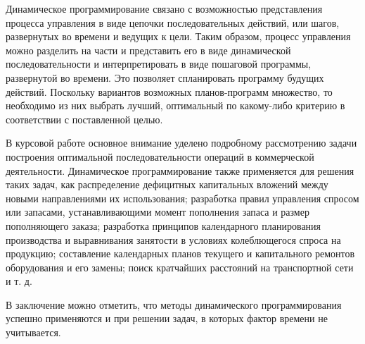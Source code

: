 
Динамическое программирование связано с возможностью представления процесса управления в виде цепочки последовательных действий, или шагов, развернутых во времени и ведущих к цели. Таким образом, процесс управления можно разделить на части и представить его в виде динамической последовательности и интерпретировать в виде пошаговой программы, развернутой во времени. Это позволяет спланировать программу будущих действий. Поскольку вариантов возможных планов-программ множество, то необходимо из них выбрать лучший, оптимальный по какому-либо критерию в соответствии с поставленной целью.

В курсовой работе основное внимание уделено подробному рассмотрению задачи построения оптимальной последовательности операций в коммерческой деятельности. Динамическое программирование также применяется для решения таких задач, как распределение дефицитных капитальных вложений между новыми направлениями их использования; разработка правил управления спросом или запасами, устанавливающими момент пополнения запаса и размер пополняющего заказа; разработка принципов календарного планирования производства и выравнивания занятости в условиях колеблющегося спроса на продукцию; составление календарных планов текущего и капитального ремонтов оборудования и его замены; поиск кратчайших расстояний на транспортной сети и т. д.

В заключение можно отметить, что методы динамического программирования успешно применяются и при решении задач, в которых фактор времени не учитывается.